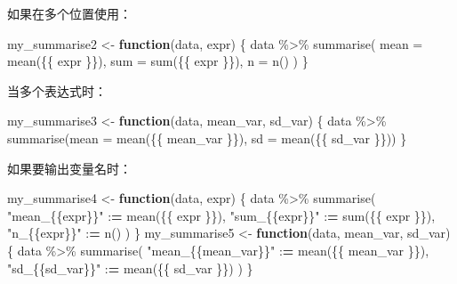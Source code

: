 \documentclass[
]{book}
\newenvironment{Shaded}{\begin{snugshade}}{\end{snugshade}}
\newcommand{\AttributeTok}[1]{\textcolor[rgb]{0.77,0.63,0.00}{#1}}
\newcommand{\ControlFlowTok}[1]{\textcolor[rgb]{0.13,0.29,0.53}{\textbf{#1}}}
\newcommand{\ErrorTok}[1]{\textcolor[rgb]{0.64,0.00,0.00}{\textbf{#1}}}
\newcommand{\FunctionTok}[1]{\textcolor[rgb]{0.00,0.00,0.00}{#1}}
\newcommand{\NormalTok}[1]{#1}
\newcommand{\OtherTok}[1]{\textcolor[rgb]{0.56,0.35,0.01}{#1}}
\newcommand{\SpecialCharTok}[1]{\textcolor[rgb]{0.00,0.00,0.00}{#1}}
\newcommand{\StringTok}[1]{\textcolor[rgb]{0.31,0.60,0.02}{#1}}
\begin{document}
如果在多个位置使用：

\begin{Shaded}
\begin{Highlighting}[]
\NormalTok{my\_summarise2 }\OtherTok{\textless{}{-}} \ControlFlowTok{function}\NormalTok{(data, expr) \{}
\NormalTok{  data }\SpecialCharTok{\%\textgreater{}\%} \FunctionTok{summarise}\NormalTok{(}
    \AttributeTok{mean =} \FunctionTok{mean}\NormalTok{(\{\{ expr \}\}),}
    \AttributeTok{sum =} \FunctionTok{sum}\NormalTok{(\{\{ expr \}\}),}
    \AttributeTok{n =} \FunctionTok{n}\NormalTok{()}
\NormalTok{  )}
\NormalTok{\}}
\end{Highlighting}
\end{Shaded}

当多个表达式时：

\begin{Shaded}
\begin{Highlighting}[]
\NormalTok{my\_summarise3 }\OtherTok{\textless{}{-}} \ControlFlowTok{function}\NormalTok{(data, mean\_var, sd\_var) \{}
\NormalTok{  data }\SpecialCharTok{\%\textgreater{}\%} 
    \FunctionTok{summarise}\NormalTok{(}\AttributeTok{mean =} \FunctionTok{mean}\NormalTok{(\{\{ mean\_var \}\}), }\AttributeTok{sd =} \FunctionTok{mean}\NormalTok{(\{\{ sd\_var \}\}))}
\NormalTok{\}}
\end{Highlighting}
\end{Shaded}

如果要输出变量名时：

\begin{Shaded}
\begin{Highlighting}[]
\NormalTok{my\_summarise4 }\OtherTok{\textless{}{-}} \ControlFlowTok{function}\NormalTok{(data, expr) \{}
\NormalTok{  data }\SpecialCharTok{\%\textgreater{}\%} \FunctionTok{summarise}\NormalTok{(}
    \StringTok{"mean\_\{\{expr\}\}"} \SpecialCharTok{:}\ErrorTok{=} \FunctionTok{mean}\NormalTok{(\{\{ expr \}\}),}
    \StringTok{"sum\_\{\{expr\}\}"} \SpecialCharTok{:}\ErrorTok{=} \FunctionTok{sum}\NormalTok{(\{\{ expr \}\}),}
    \StringTok{"n\_\{\{expr\}\}"} \SpecialCharTok{:}\ErrorTok{=} \FunctionTok{n}\NormalTok{()}
\NormalTok{  )}
\NormalTok{\}}
\NormalTok{my\_summarise5 }\OtherTok{\textless{}{-}} \ControlFlowTok{function}\NormalTok{(data, mean\_var, sd\_var) \{}
\NormalTok{  data }\SpecialCharTok{\%\textgreater{}\%} 
    \FunctionTok{summarise}\NormalTok{(}
      \StringTok{"mean\_\{\{mean\_var\}\}"} \SpecialCharTok{:}\ErrorTok{=} \FunctionTok{mean}\NormalTok{(\{\{ mean\_var \}\}), }
      \StringTok{"sd\_\{\{sd\_var\}\}"} \SpecialCharTok{:}\ErrorTok{=} \FunctionTok{mean}\NormalTok{(\{\{ sd\_var \}\})}
\NormalTok{    )}
\NormalTok{\}}
\end{Highlighting}
\end{Shaded}
\end{document}
